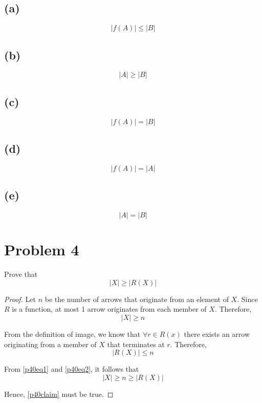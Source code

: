 \documentclass{article}
\begin{document}
\subsection{(a)}
\[
	|f(A)| \le |B|
\]

\subsection{(b)}
\[
	|A| \ge |B|
\]

\subsection{(c)}
\[
	|f(A)| = |B|
\]

\subsection{(d)}
\[
	|f(A)| = |A|
\]

\subsection{(e)}
\[
	|A| = |B|
\]

\pagebreak

\section{Problem 4}
Prove that
\begin{equation}\label{p40claim}
	|X| \ge |R(X)|
\end{equation}
\begin{proof}
	Let $n$ be the number of arrows that originate from an element of $X$.  Since $R$ is a function, at most 1 arrow originates from each member of $X$. Therefore,
	\begin{equation}\label{p40eq1}
		|X| \ge n
	\end{equation}

	From the definition of image, we know that $\forall r \in R(x)$ there exists an arrow originating from a member of $X$ that terminates at $r$. Therefore,
	\begin{equation}\label{p40eq2}
		|R(X)| \le n
	\end{equation}

	From \eqref{p40eq1} and \eqref{p40eq2}, it follows that
	\[
		|X| \ge n \ge |R(X)|
	\]

	Hence, \eqref{p40claim} must be true.

\end{proof}
\end{document}
